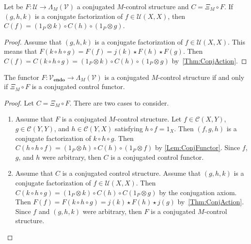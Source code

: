 \begin{lem}
    \label{Lem:ConjFunctor}
    Let be $F: \mathcal{U} \to \Lambda_M( \mathcal{V} )$ a conjugated $M$-control structure and $C = \Xi_M \circ F$.
    If $( g, h, k )$ is a conjugate factorization of $f \in \mathcal{U}( X, X )$, then $C( f ) = ( 1_P \otimes k ) \circ C( h ) \circ ( 1_P \otimes g )$.
\end{lem}

\begin{proof}
    Assume that $( g, h, k )$ is a conjugate factorization of $f \in \mathcal{U}( X, X )$.
    This means that $F( k \circ h \circ g ) = F( f ) = j( k ) \star F( h ) \star F( g )$.
    Then $C( f ) = C( k \circ h \circ g ) = ( 1_P \otimes k ) \circ C( h ) \circ ( 1_P \otimes g )$ by~\cref{Thm:ConjAction}.
\end{proof}

\begin{thm}
    \label{Thm:ConjStruct}
    The functor $F: \mathcal{V}_{\mathbf{endo}} \to \Lambda_M( \mathcal{V} )$ is a conjugated $M$-control structure if and only if $\Xi_M \circ F$ is a conjugated control functor.
\end{thm}

\begin{proof}
    Let $C = \Xi_M \circ F$.
    There are two cases to consider.
    \begin{enumerate}[align=left]
    \item[$\Rightarrow$]
          Assume that $F$ is a conjugated $M$-control structure.
          Let $f \in \mathcal{C}( X, Y )$, $g \in \mathcal{C}( Y, Y )$, and $h \in \mathcal{C}( Y, X )$ satisfying $h \circ f = 1_X$.
          Then $( f, g, h )$ is a conjugate factorization of $k \circ h \circ g$.
          Then $C( h \circ h \circ f ) = ( 1_P \otimes h ) \circ C( h ) \circ ( 1_P \otimes f )$ by \cref{Lem:ConjFunctor}.
          Since $f$, $g$, and $h$ were arbitrary, then $C$ is a conjugated control functor.
    \item[$\Leftarrow$]
          Assume that $C$ is a conjugated control structure.
          Assume that $( g, h, k )$ is a conjugate factorization of $f \in \mathcal{U}( X, X )$.
          Then $C( k \circ h \circ g ) = ( 1_P \otimes k ) \circ C( h ) \circ C( 1_P \otimes g )$ by the conjugation axiom.
          Then $F( f ) = F( k \circ h \circ g ) = j( k ) \star F( h ) \star j( g )$ by~\cref{Thm:ConjAction}.
          Since $f$ and $( g, h, k )$ were arbitrary, then $F$ is a conjugated $M$-control structure.
          \endproof
    \end{enumerate}
\end{proof}

